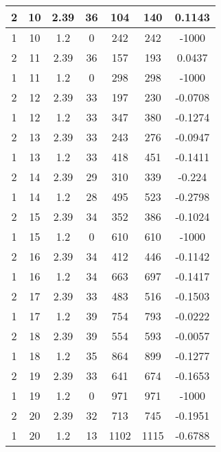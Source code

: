 \documentclass[letterpaper, 12pt]{article}
\begin{document}
\begin{longtable}{|c|c|c|c|c|c|c|}
\hline
2 & 10 & 2.39 & 36 & 104 & 140 & 0.1143 \\
\hline
1 & 10 & 1.2 & 0 & 242 & 242 & -1000 \\
\hline
2 & 11 & 2.39 & 36 & 157 & 193 & 0.0437 \\
\hline
1 & 11 & 1.2 & 0 & 298 & 298 & -1000 \\
\hline
2 & 12 & 2.39 & 33 & 197 & 230 & -0.0708 \\
\hline
1 & 12 & 1.2 & 33 & 347 & 380 & -0.1274 \\
\hline
2 & 13 & 2.39 & 33 & 243 & 276 & -0.0947 \\
\hline
1 & 13 & 1.2 & 33 & 418 & 451 & -0.1411 \\
\hline
2 & 14 & 2.39 & 29 & 310 & 339 & -0.224 \\
\hline
1 & 14 & 1.2 & 28 & 495 & 523 & -0.2798 \\
\hline
2 & 15 & 2.39 & 34 & 352 & 386 & -0.1024 \\
\hline
1 & 15 & 1.2 & 0 & 610 & 610 & -1000 \\
\hline
2 & 16 & 2.39 & 34 & 412 & 446 & -0.1142 \\
\hline
1 & 16 & 1.2 & 34 & 663 & 697 & -0.1417 \\
\hline
2 & 17 & 2.39 & 33 & 483 & 516 & -0.1503 \\
\hline
1 & 17 & 1.2 & 39 & 754 & 793 & -0.0222 \\
\hline
2 & 18 & 2.39 & 39 & 554 & 593 & -0.0057 \\
\hline
1 & 18 & 1.2 & 35 & 864 & 899 & -0.1277 \\
\hline
2 & 19 & 2.39 & 33 & 641 & 674 & -0.1653 \\
\hline
1 & 19 & 1.2 & 0 & 971 & 971 & -1000 \\
\hline
2 & 20 & 2.39 & 32 & 713 & 745 & -0.1951 \\
\hline
1 & 20 & 1.2 & 13 & 1102 & 1115 & -0.6788 \\
\hline
\end{longtable}
\end{document}
